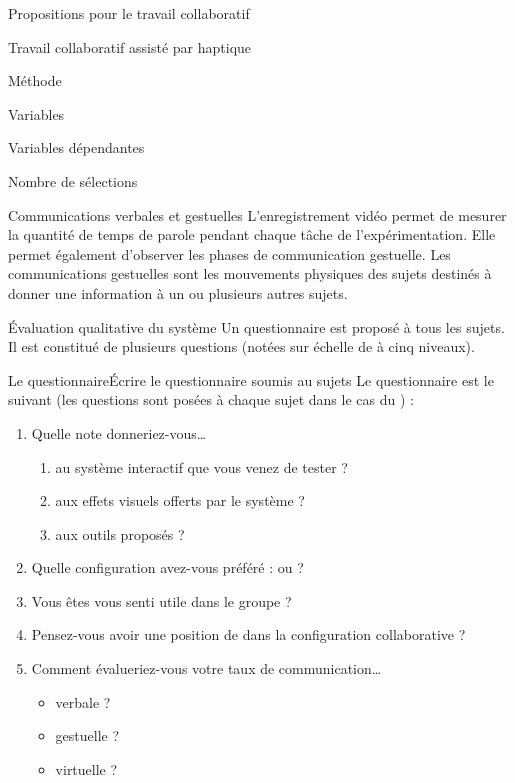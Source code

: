 \documentclass[myfrancais]{mythesis}
\begin{document}
\begin{mypart}{Propositions pour le travail collaboratif}
\begin{mychapter}{Travail collaboratif assisté par haptique}
\begin{mysection}{Méthode}
\begin{mysubsection}{Variables}
\begin{mysubsubsection}{Variables dépendantes}
\begin{myparagraph}{ Nombre de sélections}
						\end{myparagraph}
						\begin{myparagraph}{ Communications verbales et gestuelles}
							L'enregistrement vidéo permet de mesurer la quantité de temps de parole pendant chaque tâche de l'expérimentation.
							Elle permet également d'observer les phases de communication gestuelle.
							Les communications gestuelles sont les mouvements physiques des sujets destinés à donner une information à un ou plusieurs autres sujets.
						\end{myparagraph}
						\begin{myparagraph}{ Évaluation qualitative du système}
							Un questionnaire est proposé à tous les sujets.
							Il est constitué de plusieurs questions (notées sur échelle de  à cinq niveaux).

							\begin{myTodo}{Le questionnaire}{Écrire le questionnaire soumis au sujets}
								Le questionnaire est le suivant (les questions sont posées à chaque sujet dans le cas du ) :
								\begin{enumerate}
									\item Quelle note donneriez-vous\dots{}
										\begin{enumerate}
											\item au système interactif que vous venez de tester ?
											\item aux effets visuels offerts par le système ?
											\item aux outils proposés ?
										\end{enumerate}
									\item Quelle configuration avez-vous préféré :  ou  ?
									\item Vous êtes vous senti utile dans le groupe ?
									\item Pensez-vous avoir une position de  dans la configuration collaborative ?
									\item Comment évalueriez-vous votre taux de communication\dots{}
										\begin{itemize}
											\item verbale ?
											\item gestuelle ?
											\item virtuelle ?
										\end{itemize}
								\end{enumerate}
							\end{myTodo}


\end{myparagraph}
\end{mysubsubsection}
\end{mysubsection}
\end{mysection}
\end{mychapter}
\end{mypart}
\end{document}
